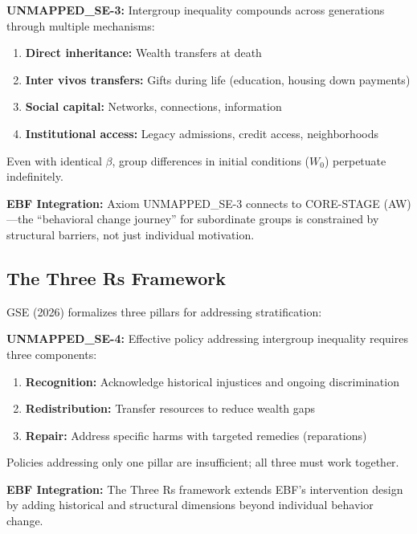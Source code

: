 \begin{axiom}
\label{ax:se-3}
\textbf{UNMAPPED_SE-3:} Intergroup inequality compounds across generations through multiple mechanisms:
\begin{enumerate}
    \item \textbf{Direct inheritance:} Wealth transfers at death
    \item \textbf{Inter vivos transfers:} Gifts during life (education, housing down payments)
    \item \textbf{Social capital:} Networks, connections, information
    \item \textbf{Institutional access:} Legacy admissions, credit access, neighborhoods
\end{enumerate}
Even with identical $\beta$, group differences in initial conditions ($W_0$) perpetuate indefinitely.
\end{axiom}

\textbf{EBF Integration:} Axiom UNMAPPED_SE-3 connects to CORE-STAGE (AW)---the ``behavioral change journey'' for subordinate groups is constrained by structural barriers, not just individual motivation.

\subsection{The Three Rs Framework}
\label{subsec:se-three-rs}

GSE (2026) formalizes three pillars for addressing stratification:

\begin{axiom}
\label{ax:se-4}
\textbf{UNMAPPED_SE-4:} Effective policy addressing intergroup inequality requires three components:
\begin{enumerate}
    \item \textbf{Recognition:} Acknowledge historical injustices and ongoing discrimination
    \item \textbf{Redistribution:} Transfer resources to reduce wealth gaps
    \item \textbf{Repair:} Address specific harms with targeted remedies (reparations)
\end{enumerate}
Policies addressing only one pillar are insufficient; all three must work together.
\end{axiom}

\textbf{EBF Integration:} The Three Rs framework extends EBF's intervention design by adding historical and structural dimensions beyond individual behavior change.

